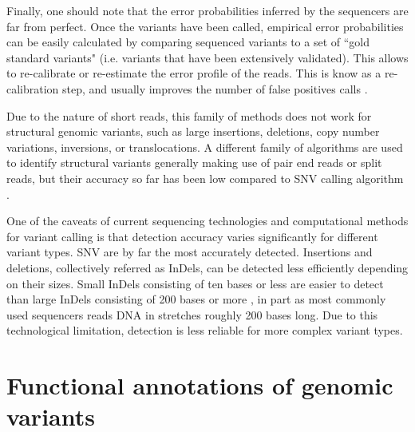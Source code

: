 Finally, one should note that the error probabilities inferred by the sequencers are far from perfect.  
Once the variants have been called, empirical error probabilities can be easily calculated \cite{mckenna2010genome} by comparing sequenced variants to a set of ``gold standard variants" (i.e. variants that have been extensively validated).  
This allows to re-calibrate or re-estimate the error profile of the reads.  This is know as a re-calibration step, and usually improves the number of false positives calls \cite{depristo2011framework}.

Due to the nature of short reads, this family of methods does not work for structural genomic variants, such as large insertions, deletions, copy number variations, inversions, or translocations.  
A different family of algorithms are used to identify structural variants generally making use of pair end reads or split reads, but their accuracy so far has been low compared to SNV calling algorithm \cite{o2013low}.

One of the caveats of current sequencing technologies and computational methods for variant calling is that detection accuracy varies significantly for different variant types. 
SNV are by far the most accurately detected. 
Insertions and deletions, collectively referred as InDels, can be detected less efficiently depending on their sizes. 
Small InDels consisting of ten bases or less are easier to detect than large InDels consisting of 200 bases or more \cite{durbin2010map}, in part as most commonly used sequencers reads DNA in stretches roughly 200 bases long. 
Due to this technological limitation, detection is less reliable for more complex variant types.

\section{Functional annotations of genomic variants \label{sec:funann}}

